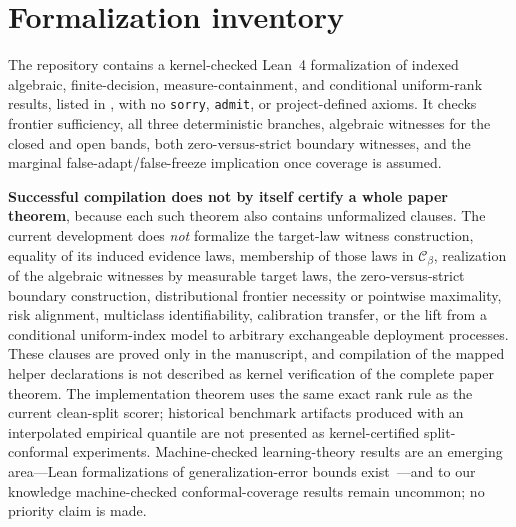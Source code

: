 \section{Formalization inventory}\label{app:formal}\label{sec:formal-scope}
The repository contains a kernel-checked Lean~4 formalization of indexed algebraic,
finite-decision, measure-containment, and conditional uniform-rank results, listed in
, with no \texttt{sorry}, \texttt{admit}, or project-defined
axioms. It checks frontier sufficiency, all three deterministic branches, algebraic witnesses for
the closed and open bands, both zero-versus-strict boundary witnesses, and the marginal
false-adapt/false-freeze implication once coverage is assumed.

\textbf{Successful compilation does not by itself certify a whole paper theorem}, because each such
theorem also contains unformalized clauses. The current development does \emph{not} formalize the
target-law witness construction, equality of its induced evidence laws, membership of those laws in
$\mathcal C_\beta$, realization of the algebraic witnesses by measurable target laws, the
zero-versus-strict boundary construction, distributional frontier necessity or pointwise
maximality, risk alignment, multiclass identifiability, calibration transfer, or the lift from a
conditional uniform-index model to arbitrary exchangeable deployment processes. These clauses are
proved only in the manuscript, and compilation of the mapped helper declarations is not described as
kernel verification of the complete paper theorem. The implementation theorem uses the same exact
rank rule as the current clean-split scorer; historical benchmark artifacts produced with an
interpolated empirical quantile are not presented as kernel-certified split-conformal experiments.
Machine-checked learning-theory results are an emerging area---Lean formalizations of
generalization-error bounds exist~\cite{sonoda2025lean}---and to our knowledge machine-checked
conformal-coverage results remain uncommon; no priority claim is made.

